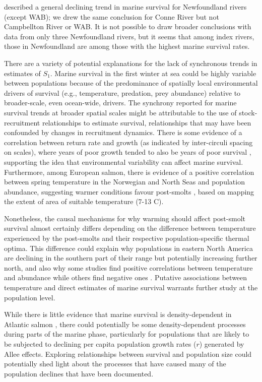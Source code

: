 \documentclass[12pt]{article}
\newcommand{\So}{$S_{1}$\xspace}
\begin{document}
\citet{Dempson2003} described a general declining trend in marine survival for
Newfoundland rivers (except WAB); we drew the same conclusion for 
Conne River but not Campbellton River or WAB. It is not possible to draw broader conclusions
with data from only three Newfoundland rivers, but it seems that among index rivers,
those in Newfoundland are among those with the highest marine survival rates.

There are a variety of potential explanations for the lack of synchronous
trends in estimates of \So. 
Marine survival in the first winter at sea could be highly variable between
populations because of the predominance of spatially local environmental drivers of survival (e.g., temperature, predation, prey abundance) 
relative to broader-scale, even ocean-wide, drivers.
The synchrony reported for marine survival trends at broader spatial scales \citep{Massiot-Granier2014,Olmos2019}
might be attributable to the use of stock-recruitment relationships to estimate survival,
relationships that may have been confounded by changes in recruitment dynamics.
There is some evidence of a correlation between return rate and growth (as
indicated by inter-circuli spacing on scales), where years of poor growth
tended to also be years of poor survival \citep{Friedland1993}, supporting the
idea that environmental variability can affect marine survival.
Furthermore, among European salmon, there is evidence of a positive correlation
between spring temperature in the Norwegian and North Seas and population abundance, suggesting warmer
conditions favour post-smolts \citep{Friedland1998}, based on mapping the
extent of area of suitable temperature (7-13 \textdegree C).

Nonetheless, the causal mechanisms for why warming should affect post-smolt
survival almost certainly differs depending on the difference between
temperature experienced by the post-smolts and their respective
population-specific thermal optima. 
This difference could explain why populations in eastern North America are
declining in the southern part of their range but potentially increasing
further north, and also why some studies find positive correlations between
temperature and abundance \citep{Friedland1998, Friedland1998b, Jonsson2004}
while others find negative ones \citep{Friedland1993, Todd2008}.
Putative associations between temperature and direct estimates of marine
survival warrants further study at the population level.

While there is little evidence that marine survival is density-dependent in
Atlantic salmon \citep{Jonsson1998,Gibson2006}, there could potentially be
some density-dependent processes during parts of the marine phase, 
particularly for populations that are likely to be subjected to
declining per capita population growth rates ($r$) generated by Allee effects.
Exploring relationships between survival and population size could potentially
shed light about the processes that have caused many of the population
declines that have been documented.
\end{document}
